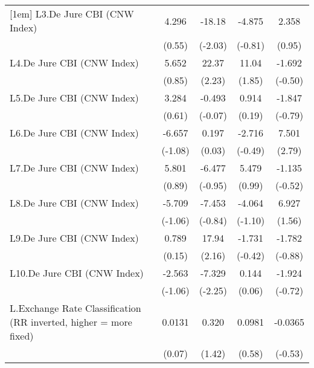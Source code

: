 {\begin{tabular}{l*{4}{c}}
[1em]
L3.De Jure CBI (CNW Index)&    4.296         &   -18.18\sym{*}  &   -4.875         &    2.358         \\
                &   (0.55)         &  (-2.03)         &  (-0.81)         &   (0.95)         \\
[1em]
L4.De Jure CBI (CNW Index)&    5.652         &    22.37\sym{*}  &    11.04         &   -1.692         \\
                &   (0.85)         &   (2.23)         &   (1.85)         &  (-0.50)         \\
[1em]
L5.De Jure CBI (CNW Index)&    3.284         &   -0.493         &    0.914         &   -1.847         \\
                &   (0.61)         &  (-0.07)         &   (0.19)         &  (-0.79)         \\
[1em]
L6.De Jure CBI (CNW Index)&   -6.657         &    0.197         &   -2.716         &    7.501\sym{**} \\
                &  (-1.08)         &   (0.03)         &  (-0.49)         &   (2.79)         \\
[1em]
L7.De Jure CBI (CNW Index)&    5.801         &   -6.477         &    5.479         &   -1.135         \\
                &   (0.89)         &  (-0.95)         &   (0.99)         &  (-0.52)         \\
[1em]
L8.De Jure CBI (CNW Index)&   -5.709         &   -7.453         &   -4.064         &    6.927         \\
                &  (-1.06)         &  (-0.84)         &  (-1.10)         &   (1.56)         \\
[1em]
L9.De Jure CBI (CNW Index)&    0.789         &    17.94\sym{*}  &   -1.731         &   -1.782         \\
                &   (0.15)         &   (2.16)         &  (-0.42)         &  (-0.88)         \\
[1em]
L10.De Jure CBI (CNW Index)&   -2.563         &   -7.329\sym{*}  &    0.144         &   -1.924         \\
                &  (-1.06)         &  (-2.25)         &   (0.06)         &  (-0.72)         \\
[1em]
L.Exchange Rate Classification (RR inverted, higher = more fixed)&   0.0131         &    0.320         &   0.0981         &  -0.0365         \\
                &   (0.07)         &   (1.42)         &   (0.58)         &  (-0.53)         \\

\end{tabular}}
